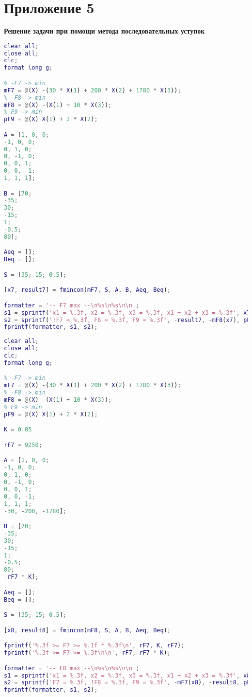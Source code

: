\section*{Приложение 5} \label{p1:5}
\textbf{Решение задачи при помощи метода последовательных уступок}
\begin{lstlisting}[language={matlab}, caption={Решение задачи для критерия F7}, label={lst:0}, basicstyle={\footnotesize\ttfamily}, breaklines={true}]
clear all;
close all; 
clc;
format long g;

% -F7 -> min
mF7 = @(X) -(30 * X(1) + 200 * X(2) + 1780 * X(3));
% -F8 -> min
mF8 = @(X) -(X(1) + 10 * X(3));
% F9 -> min
pF9 = @(X) X(1) + 2 * X(2);

A = [1, 0, 0;
-1, 0, 0;
0, 1, 0;
0, -1, 0;
0, 0, 1;
0, 0, -1;
1, 1, 1];

B = [70;
-35;
30;
-15;
1;
-0.5;
80];

Aeq = [];
Beq = [];

S = [35; 15; 0.5];

[x7, result7] = fmincon(mF7, S, A, B, Aeq, Beq);

formatter = '-- F7 max --\n%s\n%s\n\n';
s1 = sprintf('x1 = %.3f, x2 = %.3f, x3 = %.3f, x1 + x2 + x3 = %.3f', x7, sum(x7));
s2 = sprintf('!F7 = %.3f, F8 = %.3f, F9 = %.3f', -result7, -mF8(x7), pF9(x7)); 
fprintf(formatter, s1, s2);
\end{lstlisting}

\begin{lstlisting}[language={matlab}, caption={Решение задачи для критерия F8}, label={lst:0}, basicstyle={\footnotesize\ttfamily}, breaklines={true}]
clear all;
close all; 
clc;
format long g;

% -F7 -> min
mF7 = @(X) -(30 * X(1) + 200 * X(2) + 1780 * X(3));
% -F8 -> min
mF8 = @(X) -(X(1) + 10 * X(3));
% F9 -> min
pF9 = @(X) X(1) + 2 * X(2);

K = 0.85

rF7 = 9250;

A = [1, 0, 0;
-1, 0, 0;
0, 1, 0;
0, -1, 0;
0, 0, 1;
0, 0, -1;
1, 1, 1;
-30, -200, -1780];

B = [70;
-35;
30;
-15;
1;
-0.5;
80;
-rF7 * K];

Aeq = [];
Beq = [];

S = [35; 15; 0.5];

[x8, result8] = fmincon(mF8, S, A, B, Aeq, Beq);

fprintf('%.3f >= F7 >= %.1f * %.3f\n', rF7, K, rF7);
fprintf('%.3f >= F7 >= %.3f\n\n', rF7, rF7 * K);

formatter = '-- F8 max --\n%s\n%s\n\n';
s1 = sprintf('x1 = %.3f, x2 = %.3f, x3 = %.3f, x1 + x2 + x3 = %.3f', x8, sum(x8));
s2 = sprintf('F7 = %.3f, !F8 = %.3f, F9 = %.3f', -mF7(x8), -result8, pF9(x8)); 
fprintf(formatter, s1, s2);
\end{lstlisting}

